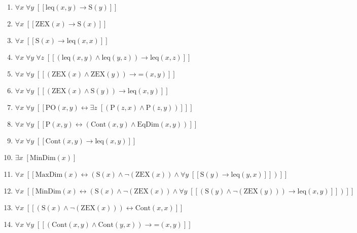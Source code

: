 \documentclass{article}
\begin{document}
\begin{enumerate}
\item $\forall x\; \forall y\;  \left[ \left[ \textrm{leq}(x,y) \rightarrow \textrm{S}(y) \right] \right]$
\item $\forall x\;  \left[ \left[ \textrm{ZEX}(x) \rightarrow \textrm{S}(x) \right] \right]$
\item $\forall x\;  \left[ \left[ \textrm{S}(x) \rightarrow \textrm{leq}(x,x) \right] \right]$
\item $\forall x\; \forall y\; \forall z\;  \left[ \left[ \left(\textrm{leq}(x,y) \land \textrm{leq}(y,z)\right) \rightarrow \textrm{leq}(x,z) \right] \right]$
\item $\forall x\; \forall y\;  \left[ \left[ \left(\textrm{ZEX}(x) \land \textrm{ZEX}(y)\right) \rightarrow \textrm{=}(x,y) \right] \right]$
\item $\forall x\; \forall y\;  \left[ \left[ \left(\textrm{ZEX}(x) \land \textrm{S}(y)\right) \rightarrow \textrm{leq}(x,y) \right] \right]$
\item $\forall x\; \forall y\;  \left[ \left[ \textrm{PO}(x,y) \leftrightarrow \exists z\;  \left[ \left(\textrm{P}(z,x) \land \textrm{P}(z,y)\right) \right] \right] \right]$
\item $\forall x\; \forall y\;  \left[ \left[ \textrm{P}(x,y) \leftrightarrow \left(\textrm{Cont}(x,y) \land \textrm{EqDim}(x,y)\right) \right] \right]$
\item $\forall x\; \forall y\;  \left[ \left[ \textrm{Cont}(x,y) \rightarrow \textrm{leq}(x,y) \right] \right]$
\item $\exists x\;  \left[ \textrm{MinDim}(x) \right]$
\item $\forall x\;  \left[ \left[ \textrm{MaxDim}(x) \leftrightarrow \left(\textrm{S}(x) \land \neg \left(\textrm{ZEX}(x)\right) \land \forall y\;  \left[ \left[ \textrm{S}(y) \rightarrow \textrm{leq}(y,x) \right] \right]\right) \right] \right]$
\item $\forall x\;  \left[ \left[ \textrm{MinDim}(x) \leftrightarrow \left(\textrm{S}(x) \land \neg \left(\textrm{ZEX}(x)\right) \land \forall y\;  \left[ \left[ \left(\textrm{S}(y) \land \neg \left(\textrm{ZEX}(y)\right)\right) \rightarrow \textrm{leq}(x,y) \right] \right]\right) \right] \right]$
\item $\forall x\;  \left[ \left[ \left(\textrm{S}(x) \land \neg \left(\textrm{ZEX}(x)\right)\right) \leftrightarrow \textrm{Cont}(x,x) \right] \right]$
\item $\forall x\; \forall y\;  \left[ \left[ \left(\textrm{Cont}(x,y) \land \textrm{Cont}(y,x)\right) \rightarrow \textrm{=}(x,y) \right] \right]$

\end{enumerate}
\end{document}
